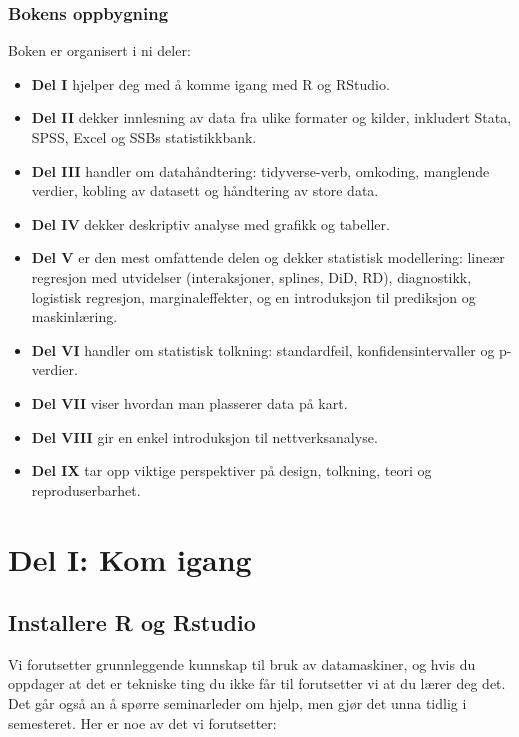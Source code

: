\documentclass[
  norsk,
  letterpaper,
  DIV=11,
  numbers=noendperiod]{scrreprt}
\providecommand{\tightlist}{%
  \setlength{\itemsep}{0pt}\setlength{\parskip}{0pt}}
\theoremstyle{definition}
\theoremstyle{remark}
\begin{document}
\section*{Bokens oppbygning}\label{bokens-oppbygning}


Boken er organisert i ni deler:

\begin{itemize}
\tightlist
\item
  \textbf{Del I} hjelper deg med å komme igang med R og RStudio.
\item
  \textbf{Del II} dekker innlesning av data fra ulike formater og
  kilder, inkludert Stata, SPSS, Excel og SSBs statistikkbank.
\item
  \textbf{Del III} handler om datahåndtering: tidyverse-verb, omkoding,
  manglende verdier, kobling av datasett og håndtering av store data.
\item
  \textbf{Del IV} dekker deskriptiv analyse med grafikk og tabeller.
\item
  \textbf{Del V} er den mest omfattende delen og dekker statistisk
  modellering: lineær regresjon med utvidelser (interaksjoner, splines,
  DiD, RD), diagnostikk, logistisk regresjon, marginaleffekter, og en
  introduksjon til prediksjon og maskinlæring.
\item
  \textbf{Del VI} handler om statistisk tolkning: standardfeil,
  konfidensintervaller og p-verdier.
\item
  \textbf{Del VII} viser hvordan man plasserer data på kart.
\item
  \textbf{Del VIII} gir en enkel introduksjon til nettverksanalyse.
\item
  \textbf{Del IX} tar opp viktige perspektiver på design, tolkning,
  teori og reproduserbarhet.
\end{itemize}

\part{Del I: Kom igang}

\chapter{Installere R og Rstudio}\label{installere-r-og-rstudio}

Vi forutsetter grunnleggende kunnskap til bruk av datamaskiner, og hvis
du oppdager at det er tekniske ting du ikke får til forutsetter vi at du
lærer deg det. Det går også an å spørre seminarleder om hjelp, men gjør
det unna tidlig i semesteret. Her er noe av det vi forutsetter:
\end{document}
